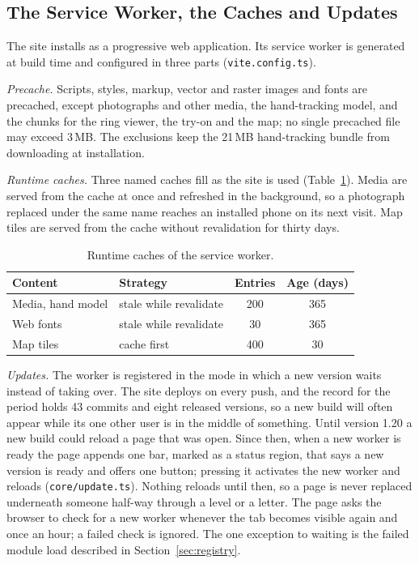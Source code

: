 \documentclass[sigconf,nonacm]{acmart}
\newcommand{\code}[1]{\textnormal{\texttt{\small #1}}}
\begin{document}
\subsection{The Service Worker, the Caches and Updates}\label{sec:update}
The site installs as a progressive web application. Its service worker is generated at build
time and configured in three parts (\code{vite.config.ts}).

\emph{Precache.} Scripts, styles, markup, vector and raster images and fonts are precached,
except photographs and other media, the hand-tracking model, and the chunks for the ring
viewer, the try-on and the map; no single precached file may exceed 3\,MB. The exclusions keep
the 21\,MB hand-tracking bundle from downloading at installation.

\emph{Runtime caches.} Three named caches fill as the site is used
(Table~\ref{tab:caches}). Media are served from the cache at once and refreshed in the
background, so a photograph replaced under the same name reaches an installed phone on its
next visit. Map tiles are served from the cache without revalidation for thirty days.

\begin{table}[t]
  \caption{Runtime caches of the service worker.}
  \label{tab:caches}
  \small
  \begin{tabular}{@{}p{}p{}cc@{}}
    \toprule
    Content & Strategy & Entries & Age (days) \\
    \midrule
    Media, hand model & stale while revalidate & 200 & 365 \\
    Web fonts & stale while revalidate & 30 & 365 \\
    Map tiles & cache first & 400 & 30 \\
    \bottomrule
  \end{tabular}
\end{table}

\emph{Updates.} The worker is registered in the mode in which a new version waits instead of
taking over. The site deploys on every push, and the record for the period holds 43 commits
and eight released versions, so a new build will often appear while its one other user is in
the middle of something. Until version 1.20 a new build could reload a page that was open.
Since then, when a new worker is ready the page appends one bar, marked as a status region,
that says a new version is ready and offers one button; pressing it activates the new worker
and reloads (\code{core/update.ts}). Nothing reloads until then, so a page is never replaced
underneath someone half-way through a level or a letter. The page asks the browser to check
for a new worker whenever the tab becomes visible again and once an hour; a failed check is
ignored. The one exception to waiting is the failed module load described in
Section~\ref{sec:registry}.
\end{document}
